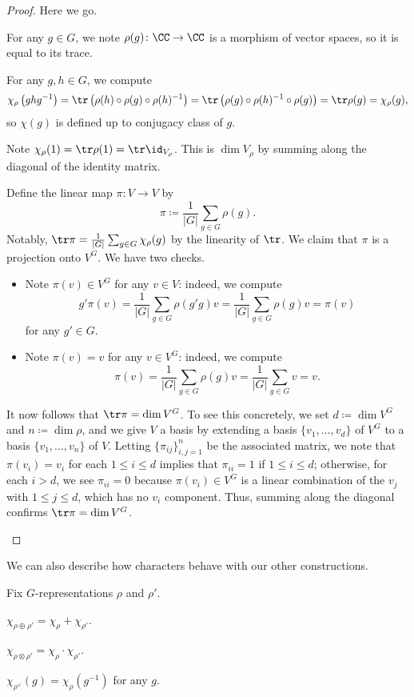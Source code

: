 \documentclass{article}
\begin{document}
\begin{proof}
	Here we go.
	\begin{listalph}
		\item For any $g\in G$, we note $\rho(g)\colon\CC\to\CC$ is a morphism of vector spaces, so it is equal to its trace.
		\item For any $g,h\in G$, we compute
		\[\chi_\rho\left(ghg^{-1}\right)=\tr\left(\rho(h)\circ\rho(g)\circ\rho(h)^{-1}\right)=\tr\left(\rho(g)\circ\rho(h)^{-1}\circ\rho(g)\right)=\tr\rho(g)=\chi_\rho(g),\]
		so $\chi(g)$ is defined up to conjugacy class of $g$.
		\item Note $\chi_\rho(1)=\tr\rho(1)=\tr\id_{V_\rho}$. This is $\dim V_\rho$ by summing along the diagonal of the identity matrix.
		\item Define the linear map $\pi\colon V\to V$ by
		\[\pi\coloneqq\frac1{|G|}\sum_{g\in G}\rho(g).\]
		Notably, $\tr\pi=\frac1{|G|}\sum_{g\in G}\chi_\rho(g)$ by the linearity of $\tr$. We claim that $\pi$ is a projection onto $V^G$. We have two checks.
		\begin{itemize}
			\item Note $\pi(v)\in V^G$ for any $v\in V$: indeed, we compute
			\[g'\pi(v)=\frac1{|G|}\sum_{g\in G}\rho(g'g)v=\frac1{|G|}\sum_{g\in G}\rho(g)v=\pi(v)\]
			for any $g'\in G$.
			\item Note $\pi(v)=v$ for any $v\in V^G$: indeed, we compute
			\[\pi(v)=\frac1{|G|}\sum_{g\in G}\rho(g)v=\frac1{|G|}\sum_{g\in G}v=v.\]
		\end{itemize}
		It now follows that $\tr\pi=\dim V^G$. To see this concretely, we set $d\coloneqq\dim V^G$ and $n\coloneqq\dim\rho$, and we give $V$ a basis by extending a basis $\{v_1,\ldots,v_d\}$ of $V^G$ to a basis $\{v_1,\ldots,v_n\}$ of $V$. Letting $\{\pi_{ij}\}_{i,j=1}^n$ be the associated matrix, we note that $\pi(v_i)=v_i$ for each $1\le i\le d$ implies that $\pi_{ii}=1$ if $1\le i\le d$; otherwise, for each $i>d$, we see $\pi_{ii}=0$ because $\pi(v_i)\in V^G$ is a linear combination of the $v_j$ with $1\le j\le d$, which has no $v_i$ component. Thus, summing along the diagonal confirms $\tr\pi=\dim V^G$.
		\qedhere
	\end{listalph}
\end{proof}
We can also describe how characters behave with our other constructions.
\begin{lemma} \label{lem:build-chars}
	Fix $G$-representations $\rho$ and $\rho'$.
	\begin{listalph}
		\item $\chi_{\rho\oplus\rho'}=\chi_\rho+\chi_{\rho'}$.
		\item $\chi_{\rho\otimes\rho'}=\chi_{\rho}\cdot\chi_{\rho'}$.
		\item $\chi_{\rho^\lor}(g)=\chi_\rho\left(g^{-1}\right)$ for any $g$.
	\end{listalph}
\end{lemma}
\end{document}
